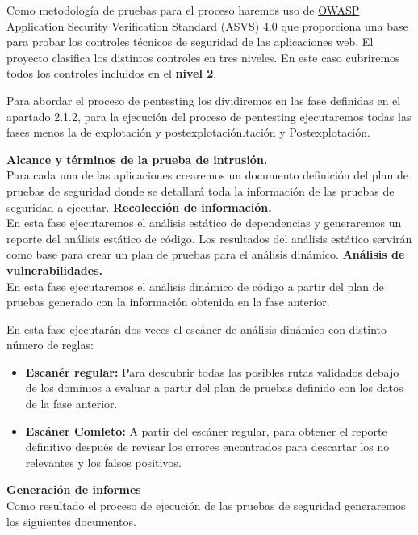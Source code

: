Como metodología de pruebas para el proceso haremos uso 
de \href{https://owasp.org/www-pdf-archive/OWASP_Application_Security_Verification_Standard_4.0-en.pdf}{OWASP Application Security Verification Standard (ASVS) 4.0} 
que proporciona una base para probar los controles técnicos de seguridad de las aplicaciones web. El proyecto clasifica
 los distintos controles en tres niveles. En este caso cubriremos todos los controles incluidos en el \textbf{nivel 2}.

 Para abordar el proceso de pentesting los dividiremos en las fase definidas en el 
 apartado 2.1.2, para la ejecución del proceso de pentesting ejecutaremos todas las fases menos la 
 de explotación y postexplotación.tación y Postexplotación.

\textbf{Alcance y términos de la prueba de intrusión.}\\
 Para cada una de las aplicaciones crearemos un documento definición del plan de pruebas de seguridad donde se
detallará toda la información de las pruebas de seguridad a ejecutar.
\textbf{Recolección de información.}\\
En esta fase ejecutaremos el análisis estático de dependencias y generaremos un reporte del análisis estático de código. Los resultados del 
análisis estático servirán como base para crear un plan de pruebas para el análisis dinámico.
\textbf{Análisis de vulnerabilidades.}\\
En esta fase ejecutaremos el análisis dinámico de código a partir del plan de pruebas generado con la información obtenida en la fase anterior.

En esta fase ejecutarán dos veces el escáner de análisis dinámico con distinto número de reglas:

\begin{itemize}
    \item \textbf{Escanér regular:} Para descubrir todas las posibles rutas validados debajo de los dominios 
    a evaluar a partir del plan de pruebas definido con los datos de la fase anterior.
    \item \textbf{Escáner Comleto:} A partir del escáner regular, para obtener el reporte definitivo después 
    de revisar los errores encontrados para descartar los no relevantes y los falsos positivos.
\end{itemize}

\textbf{Generación de informes}\\
Como resultado el proceso de ejecución de las pruebas de seguridad generaremos los siguientes documentos.


